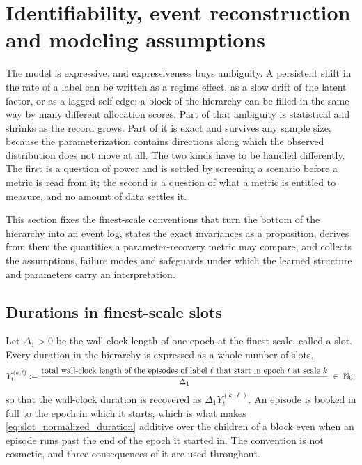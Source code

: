 \section{Identifiability, event reconstruction and modeling assumptions}
\label{sec:identifiability}

The model is expressive, and expressiveness buys ambiguity. A persistent shift
in the rate of a label can be written as a regime effect, as a slow drift of
the latent factor, or as a lagged self edge; a block of the hierarchy can be
filled in the same way by many different allocation scores. Part of that
ambiguity is statistical and shrinks as the record grows. Part of it is exact
and survives any sample size, because the parameterization contains directions
along which the observed distribution does not move at all. The two kinds have
to be handled differently. The first is a question of power and is settled by
screening a scenario before a metric is read from it; the second is a question
of what a metric is entitled to measure, and no amount of data settles it.

This section fixes the finest-scale conventions that turn the bottom of the
hierarchy into an event log, states the exact invariances as a proposition,
derives from them the quantities a parameter-recovery metric may compare, and
collects the assumptions, failure modes and safeguards under which the learned
structure and parameters carry an interpretation.

\subsection{Durations in finest-scale slots}
\label{sec:slot_durations}

Let $\Delta_1 > 0$ be the wall-clock length of one epoch at the finest scale,
called a slot. Every duration in the hierarchy is expressed as a whole number
of slots,
\begin{align}
Y_t^{(k,\ell)}
:=
\frac{\text{total wall-clock length of the episodes of label } \ell
      \text{ that start in epoch } t \text{ at scale } k}{\Delta_1}
\;\in\; {\mathbb{N}}_0 ,
\label{eq:slot_normalized_duration}
\end{align}
so that the wall-clock duration is recovered as $\Delta_1 Y_t^{(k,\ell)}$. An
episode is booked in full to the epoch in which it starts, which is what makes
\cref{eq:slot_normalized_duration} additive over the children of a block even
when an episode runs past the end of the epoch it started in. The convention is
not cosmetic, and three consequences of it are used throughout.


